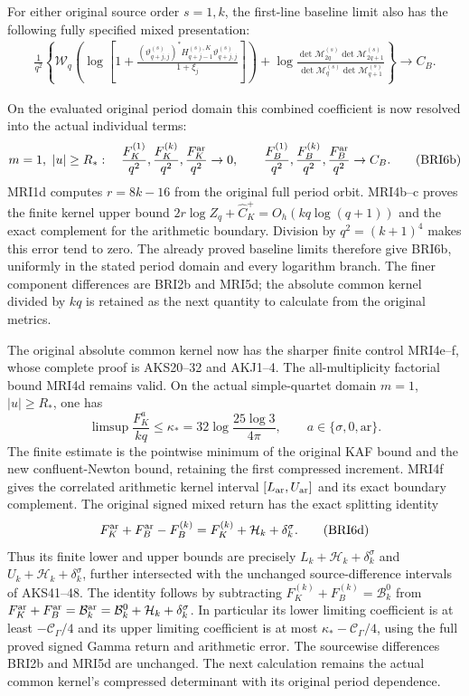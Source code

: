 \documentclass[11pt,a4paper]{article}
\begin{document}
For either original source order $s=1,k$, the first-line baseline
limit also has the following fully specified mixed presentation:
\[
\begin{split}
 \frac1{q^2}\left\{
 \mathcal W_q\left(\log\left[1+
   \frac{(\vartheta_{q+j,j}^{(s)})^*
        H_{q+j-1}^{(s),K}\vartheta_{q+j,j}^{(s)}}{1+\xi_j}
                                      \right]\right)
 +\log\frac{\det\mathcal M_{2q}^{(s)}\det\mathcal M_{2q+1}^{(s)}}
                 {\det\mathcal M_q^{(s)}\det\mathcal M_{q+1}^{(s)}}
                          \right\}\longrightarrow C_B.
\end{split}\tag{BRI6a}
\]

On the evaluated original period domain this combined
coefficient is now resolved into the actual individual terms:
\[
 m=1,\ |u|\ge R_*:\quad
 \frac{F_K^{(1)}}{q^2},\frac{F_K^{(k)}}{q^2},
 \frac{F_K^{\rm ar}}{q^2}\to0,\qquad
 \frac{F_B^{(1)}}{q^2},\frac{F_B^{(k)}}{q^2},
 \frac{F_B^{\rm ar}}{q^2}\to C_B.
 \tag{BRI6b}
\]
MRI1d computes $r=8k-16$ from the original full period
orbit. MRI4b--c proves the finite kernel upper bound
$2r\log Z_q+\widehat C_K^+=O_h(kq\log(q+1))$ and the
exact complement for the arithmetic boundary. Division by
$q^2=(k+1)^4$ makes this error tend to zero. The already
proved baseline limits therefore give BRI6b, uniformly in
the stated period domain and every logarithm branch.
The finer component differences are BRI2b and MRI5d;
the absolute common kernel divided by $kq$ is retained
as the next quantity to calculate from the original metrics.

The original absolute common kernel now has the sharper finite
control MRI4e--f, whose complete proof is AKS20--32 and AKJ1--4.
The all-multiplicity factorial bound MRI4d remains valid. On the
actual simple-quartet domain $m=1$, $|u|\ge R_*$, one has
\[
 \limsup\frac{F_K^a}{kq}
 \le\kappa_*=32\log\frac{25\log3}{4\pi},\qquad
 a\in\{\sigma,0,\mathrm{ar}\}.
 \tag{BRI6c}
\]
The finite estimate is the pointwise minimum of the original KAF
bound and the new confluent-Newton bound, retaining the first
compressed increment. MRI4f gives the correlated arithmetic kernel
interval $[L_{\rm ar},U_{\rm ar}]$ and its exact boundary complement.
The original signed mixed return has the exact splitting identity
\[
 F_K^{\rm ar}+F_B^{\rm ar}-F_B^{(k)}
   =F_K^{(k)}+\mathcal H_k+\delta_k^\sigma.
 \tag{BRI6d}
\]
Thus its finite lower and upper bounds are precisely
$L_k+\mathcal H_k+\delta_k^\sigma$ and
$U_k+\mathcal H_k+\delta_k^\sigma$, further intersected with the
unchanged source-difference intervals of AKS41--48. The identity
follows by subtracting
$F_K^{(k)}+F_B^{(k)}=\mathcal B_k^0$ from
$F_K^{\rm ar}+F_B^{\rm ar}=\mathcal B_k^{\rm ar}
 =\mathcal B_k^0+\mathcal H_k+\delta_k^\sigma$.
In particular its lower limiting coefficient is at least
$-\mathcal C_\Gamma/4$ and its upper limiting coefficient is at
most $\kappa_*-\mathcal C_\Gamma/4$, using the full proved signed
Gamma return and arithmetic error. The sourcewise differences
BRI2b and MRI5d are unchanged. The next calculation remains the
actual common kernel's compressed determinant with its original
period dependence.
\end{document}

